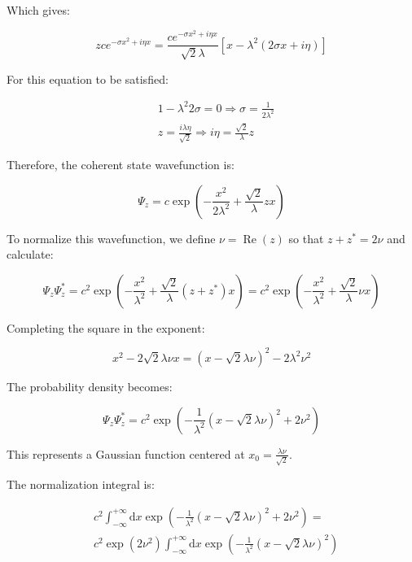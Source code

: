 \documentclass[italian]{HKNdocument}
\begin{document}
Which gives:

\begin{equation}
z c e^{-\sigma x^{2}+i \eta x}=\frac{c e^{-\sigma x^{2}+i \eta x}}{\sqrt{2} \lambda}\left[x-\lambda^{2}(2 \sigma x+i \eta)\right]
\end{equation}

For this equation to be satisfied:

\begin{align}
& 1-\lambda^{2} 2 \sigma=0 \Longrightarrow \sigma=\frac{1}{2 \lambda^{2}} \\
& z=\frac{i \lambda \eta}{\sqrt{2}} \Longrightarrow i \eta=\frac{\sqrt{2}}{\lambda} z
\end{align}

Therefore, the coherent state wavefunction is:

\begin{equation}
\Psi_{z}=c \exp \left(-\frac{x^{2}}{2 \lambda^{2}}+\frac{\sqrt{2}}{\lambda} z x\right) \label{eq:7.53}
\end{equation}

To normalize this wavefunction, we define $\nu=\operatorname{Re}(z)$ so that $z+z^{*}=2 \nu$ and calculate:

\begin{equation}
\Psi_{z} \Psi_{z}^{*}=c^{2} \exp \left(-\frac{x^{2}}{\lambda^{2}}+\frac{\sqrt{2}}{\lambda}\left(z+z^{*}\right) x\right)=c^{2} \exp \left(-\frac{x^{2}}{\lambda^{2}}+\frac{\sqrt{2}}{\lambda} \nu x\right)
\end{equation}

Completing the square in the exponent:

\begin{equation}
x^{2}-2 \sqrt{2} \lambda \nu x=(x-\sqrt{2} \lambda \nu)^{2}-2 \lambda^{2} \nu^{2}
\end{equation}

The probability density becomes:

\begin{equation}
\Psi_{z} \Psi_{z}^{*}=c^{2} \exp \left(-\frac{1}{\lambda^{2}}(x-\sqrt{2} \lambda \nu)^{2}+2 \nu^{2}\right)
\end{equation}

This represents a Gaussian function centered at $x_{0}=\frac{\lambda \nu}{\sqrt{2}}$.

The normalization integral is:

\begin{align}
& c^{2} \int_{-\infty}^{+\infty} \mathrm{d} x \exp \left(-\frac{1}{\lambda^{2}}(x-\sqrt{2} \lambda \nu)^{2}+2 \nu^{2}\right)= \\
& c^{2} \exp \left(2 \nu^{2}\right) \int_{-\infty}^{+\infty} \mathrm{d} x \exp \left(-\frac{1}{\lambda^{2}}(x-\sqrt{2} \lambda \nu)^{2}\right)
\end{align}
\end{document}
